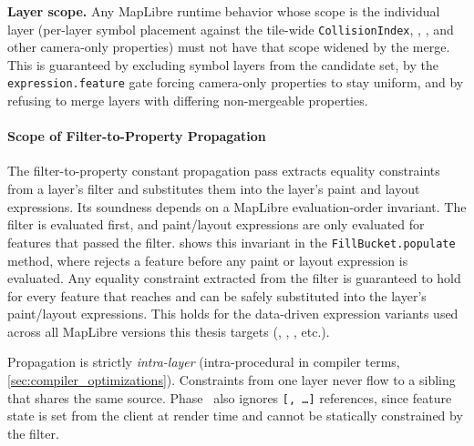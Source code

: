 \textbf{Layer scope.}
Any MapLibre runtime behavior whose scope is the individual layer (per-layer symbol placement against the tile-wide \texttt{CollisionIndex}, \texttt{}, \texttt{}, and other camera-only properties) must not have that scope widened by the merge.
This is guaranteed by excluding symbol layers from the candidate set, by the \texttt{expression.feature} gate forcing camera-only properties to stay uniform, and by refusing to merge layers with differing non-mergeable properties.

\paragraph{Scope of Filter-to-Property Propagation}
The filter-to-property constant propagation pass extracts equality constraints from a layer's filter and substitutes them into the layer's paint and layout expressions.
Its soundness depends on a MapLibre evaluation-order invariant.
The filter is evaluated first, and paint/layout expressions are only evaluated for features that passed the filter.
 shows this invariant in the \texttt{FillBucket.populate} method, where  rejects a feature before any paint or layout expression is evaluated.
Any equality constraint extracted from the filter is guaranteed to hold for every feature that reaches  and can be safely substituted into the layer's paint/layout expressions.
This holds for the data-driven expression variants used across all MapLibre versions this thesis targets (, , , etc.).

Propagation is strictly \emph{intra-layer} (intra-procedural in compiler terms, \cref{sec:compiler_optimizations}).
Constraints from one layer never flow to a sibling that shares the same source.
Phase~ also ignores \texttt{[, \ldots]} references, since feature state is set from the client at render time and cannot be statically constrained by the filter.

